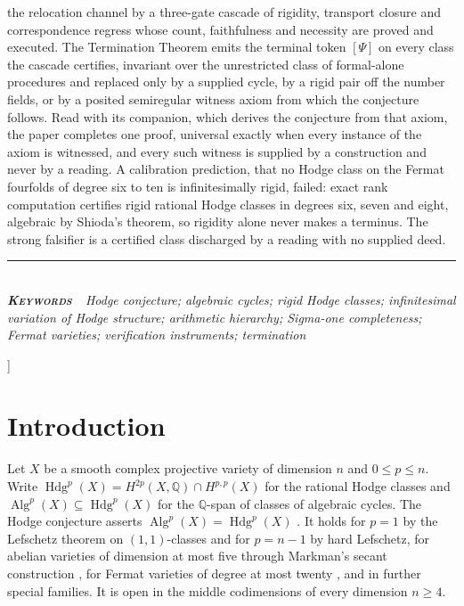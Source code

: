 \documentclass[10pt,twocolumn]{article}
\begin{document}
{\begin{minipage}{\textwidth}
{the relocation channel by a three-gate cascade of rigidity, transport
closure and correspondence regress whose count, faithfulness and
necessity are proved and executed. The Termination Theorem emits the
terminal token \([\Psi]\) on every class the cascade certifies,
invariant over the unrestricted class of formal-alone procedures and
replaced only by a supplied cycle, by a rigid pair off the number
fields, or by a posited semiregular witness axiom from which the
conjecture follows. Read with its companion, which derives the
conjecture from that axiom, the paper completes one proof, universal
exactly when every instance of the axiom is witnessed, and every such
witness is supplied by a construction and never by a reading. A
calibration prediction, that no Hodge class on the Fermat fourfolds of
degree six to ten is infinitesimally rigid, failed: exact rank
computation certifies rigid rational Hodge classes in degrees six, seven
and eight, algebraic by Shioda's theorem, so rigidity alone never makes
a terminus. The strong falsifier is a certified class discharged by a
reading with no supplied deed.}\\[4pt]
{\color{accent}\rule{\textwidth}{0.6pt}}\\[3pt]
{\itshape\footnotesize\color{faint}\textbf{\upshape\scshape\color{deep}Keywords\ }\ Hodge
conjecture; algebraic cycles; rigid Hodge classes; infinitesimal
variation of Hodge structure; arithmetic hierarchy; Sigma-one
completeness; Fermat varieties; verification instruments;
termination}\\[12pt]
\end{minipage}
}]
\thispagestyle{fancy}

\hypertarget{introduction}{%
\section{Introduction}\label{introduction}}

Let \(X\) be a smooth complex projective variety of dimension \(n\) and
\(0\le p\le n\). Write
\(\operatorname{Hdg}^p(X)=H^{2p}(X,\mathbb{Q})\cap H^{p,p}(X)\) for the
rational Hodge classes and
\(\operatorname{Alg}^p(X)\subseteq\operatorname{Hdg}^p(X)\) for the
\(\mathbb{Q}\)-span of classes of algebraic cycles. The Hodge conjecture
asserts \(\operatorname{Alg}^p(X)=\operatorname{Hdg}^p(X)\)
\cite{hodge1950,deligne2006}. It holds for \(p=1\) by the Lefschetz
theorem on \((1,1)\)-classes and for \(p=n-1\) by hard Lefschetz, for
abelian varieties of dimension at most five through Markman's secant
construction \cite{markman2025b}, for Fermat varieties of degree at most
twenty \cite{shioda1979,dasilva2021}, and in further special families.
It is open in the middle codimensions of every dimension \(n\ge 4\).
\end{document}

